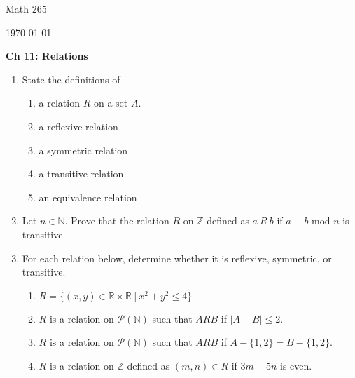 \documentclass[11pt]{report}
\theoremstyle{plain}
\begin{document}
\hfill Math 265

\hfill \today

\begin{center}
\Large{\textbf{Ch 11: Relations}} \\
\end{center}
\begin{enumerate}
\item State the definitions of
	\begin{enumerate}
	\item a relation $R$ on a set $A$.
	\item a reflexive relation
	\item a symmetric relation
	\item a transitive relation
	\item an equivalence relation\\
	\end{enumerate}
\item Let $n \in \mathbb{N}.$ Prove that the relation $R$ on $\mathbb{Z}$ defined as $a \: R \: b$ if $a \equiv b \text{ mod } n$ is transitive.\\
\newpage
\item For each relation below, determine whether it is reflexive, symmetric, or transitive.
	\begin{enumerate}
	\item $R=\{(x,y) \in \mathbb{R} \times \mathbb{R} \: | \: x^2+y^2 \leq 4\}$\\
	\vfill
	\item $R$ is a relation on $\mathcal{P}(\mathbb{N})$ such that $ A R B$ if $|A-B| \leq 2.$\\
	\vfill
	\newpage
	\item $R$ is a relation on $\mathcal{P}(\mathbb{N})$ such that $ A R B$ if $A-\{1,2\}=B-\{1,2\}.$\\
	\vfill
	\item $R$ is a relation on $\mathbb{Z}$ defined as $(m,n) \in R$ if $3m-5n$ is even.\\
	\vfill
	\end{enumerate}
\end{enumerate}
\end{document}
